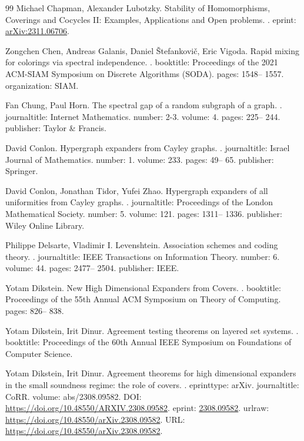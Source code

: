 \documentclass[10pt,a4paper]{article}
\theoremstyle{definition}
\theoremstyle{remark}
\numberwithin{equation}{section}
\begin{document}
\begin{thebibliography}{99}
Michael Chapman, Alexander Lubotzky.
\newblock Stability of Homomorphisms, Coverings and Cocycles II: Examples, Applications and Open problems.
.
\newblock eprint: \url{arXiv:2311.06706}.

Zongchen Chen, Andreas Galanis, Daniel Štefankovič, Eric Vigoda.
\newblock Rapid mixing for colorings via spectral independence.
.
\newblock booktitle: Proceedings of the 2021 ACM-SIAM Symposium on Discrete Algorithms (SODA).
\newblock pages: 1548-- 1557.
\newblock organization: SIAM.

Fan Chung, Paul Horn.
\newblock The spectral gap of a random subgraph of a graph.
.
\newblock journaltitle: Internet Mathematics.
\newblock number: 2-3.
\newblock volume: 4.
\newblock pages: 225-- 244.
\newblock publisher: Taylor \& Francis.

David Conlon.
\newblock Hypergraph expanders from Cayley graphs.
.
\newblock journaltitle: Israel Journal of Mathematics.
\newblock number: 1.
\newblock volume: 233.
\newblock pages: 49-- 65.
\newblock publisher: Springer.

David Conlon, Jonathan Tidor, Yufei Zhao.
\newblock Hypergraph expanders of all uniformities from Cayley graphs.
.
\newblock journaltitle: Proceedings of the London Mathematical Society.
\newblock number: 5.
\newblock volume: 121.
\newblock pages: 1311-- 1336.
\newblock publisher: Wiley Online Library.

Philippe Delsarte, Vladimir I. Levenshtein.
\newblock Association schemes and coding theory.
.
\newblock journaltitle: IEEE Transactions on Information Theory.
\newblock number: 6.
\newblock volume: 44.
\newblock pages: 2477-- 2504.
\newblock publisher: IEEE.

Yotam Dikstein.
\newblock New High Dimensional Expanders from Covers.
.
\newblock booktitle: Proceedings of the 55th Annual ACM Symposium on Theory of Computing.
\newblock pages: 826-- 838.

Yotam Dikstein, Irit Dinur.
\newblock Agreement testing theorems on layered set systems.
.
\newblock booktitle: Proceedings of the 60th Annual IEEE Symposium on Foundations of Computer Science.

Yotam Dikstein, Irit Dinur.
\newblock Agreement theorems for high dimensional expanders in the small soundness regime: the role of covers.
.
\newblock eprinttype: arXiv.
\newblock journaltitle: CoRR.
\newblock volume: abs/2308.09582.
\newblock DOI: \url{https://doi.org/10.48550/ARXIV.2308.09582}.
\newblock eprint: \url{2308.09582}.
\newblock urlraw: \url{https://doi.org/10.48550/arXiv.2308.09582}.
\newblock URL: \url{https://doi.org/10.48550/arXiv.2308.09582}.


\end{thebibliography}
\end{document}
